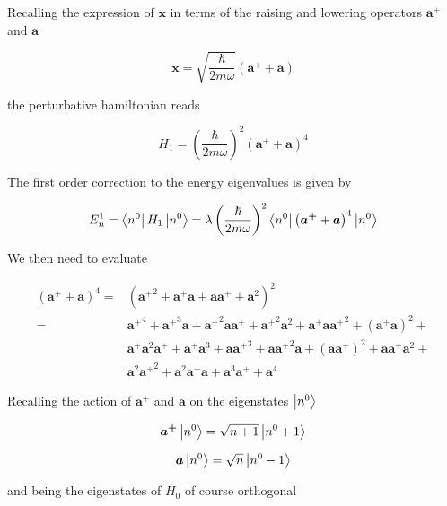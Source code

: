\documentclass{article}
\begin{document}
Recalling the expression of \( \bm{x} \) in terms of the raising and lowering operators \( \bm{a^+} \) and \( \bm{a} \)

\begin{equation}
\label{eq:x_def}
\bm{x} = \sqrt{ \frac{\hbar}{2m \omega}} \left( \bm{a^+} + \bm{a} \right)
\end{equation}

the perturbative hamiltonian reads

\begin{equation}
H_1 = \left( \frac{\hbar}{2m \omega} \right)^2 \left( \bm{a^+} + \bm{a} \right)^4
\end{equation}

The first order correction to the energy eigenvalues is given by

\begin{equation}
\label{eq:energy_correction}
E_n^1 = \bra{n^0} H_1 \ket{n^0} = \lambda \left( \frac{\hbar}{2m \omega} \right)^2 \bra{n^0} \left( \bm{a^+} + \bm{a} \right)^4 \ket{n^0}
\end{equation}

We then need to evaluate

\begin{align}
\label{eq:4expansion}
\left( \bm{a^+} + \bm{a} \right)^4 = & \left( {\bm{a^+}}^2 + \bm{a^+} \bm{a} + \bm{a} \bm{a^+} + \bm{a}^2 \right)^2 \nonumber \\
= & {\bm{a^+}}^4 + {\bm{a^+}}^3 \bm{a} + {\bm{a^+}}^2 \bm{a} \bm{a^+} + {\bm{a^+}}^2 \bm{a}^2 + \bm{a^+} \bm{a} {\bm{a^+}}^2 + (\bm{a^+}\bm{a})^2 + \nonumber \\ 
& \bm{a^+}\bm{a}^2\bm{a^+} + \bm{a^+} \bm{a}^3 + \bm{a} {\bm{a^+}}^3 + \bm{a} {\bm{a^+}}^2 \bm{a} + (\bm{a} \bm{a^+})^2 + \bm{a} \bm{a^+} \bm{a}^2 + \nonumber \\
& \bm{a}^2 {\bm{a^+}}^2 + \bm{a}^2 \bm{a^+} \bm{a} + \bm{a}^3 \bm{a^+} + \bm{a}^4
\end{align}

Recalling the action of \( \bm{a^+} \) and \( \bm{a} \) on the eigenstates \( \ket{n^0} \)

\begin{equation}
\bm{a^+} \ket{n^0} = \sqrt{n + 1} \ket{n^0 + 1}
\end{equation}

\begin{equation}
\bm{a} \ket{n^0} = \sqrt{n} \ket{n^0 - 1}
\end{equation}

and being the eigenstates of \( H_0 \) of course orthogonal
\end{document}
